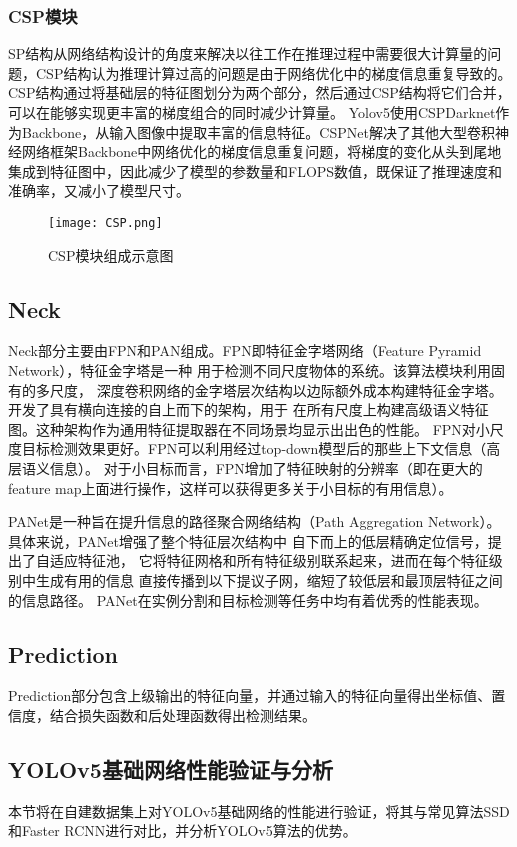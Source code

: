 \subsubsection{CSP模块}
SP结构从网络结构设计的角度来解决以往工作在推理过程中需要很大计算量的问题，CSP结构认为推理计算过高的问题是由于网络优化中的梯度信息重复导致的。CSP结构通过将基础层的特征图划分为两个部分，然后通过CSP结构将它们合并，可以在能够实现更丰富的梯度组合的同时减少计算量。
Yolov5使用CSPDarknet作为Backbone，从输入图像中提取丰富的信息特征。CSPNet解决了其他大型卷积神经网络框架Backbone中网络优化的梯度信息重复问题，将梯度的变化从头到尾地集成到特征图中，因此减少了模型的参数量和FLOPS数值，既保证了推理速度和准确率，又减小了模型尺寸。

\begin{figure}[h]
  \centering
  \texttt{[image: CSP.png]}
  \caption{CSP模块组成示意图}
  \label{csp}
\end{figure}

\subsection{Neck}
Neck部分主要由FPN和PAN组成。FPN即特征金字塔网络（Feature Pyramid Network），特征金字塔是一种
用于检测不同尺度物体的系统。该算法模块利用固有的多尺度，
深度卷积网络的金字塔层次结构以边际额外成本构建特征金字塔。开发了具有横向连接的自上而下的架构，用于
在所有尺度上构建高级语义特征图。这种架构作为通用特征提取器在不同场景均显示出出色的性能。
FPN对小尺度目标检测效果更好。FPN可以利用经过top-down模型后的那些上下文信息（高层语义信息）。
对于小目标而言，FPN增加了特征映射的分辨率（即在更大的feature map上面进行操作，这样可以获得更多关于小目标的有用信息）。

PANet是一种旨在提升信息的路径聚合网络结构（Path Aggregation Network）。
具体来说，PANet增强了整个特征层次结构中
自下而上的低层精确定位信号，提出了自适应特征池，
它将特征网格和所有特征级别联系起来，进而在每个特征级别中生成有用的信息
直接传播到以下提议子网，缩短了较低层和最顶层特征之间的信息路径。
PANet在实例分割和目标检测等任务中均有着优秀的性能表现。

\subsection{Prediction}
Prediction部分包含上级输出的特征向量，并通过输入的特征向量得出坐标值、置信度，结合损失函数和后处理函数得出检测结果。

\subsection{YOLOv5基础网络性能验证与分析}
本节将在自建数据集上对YOLOv5基础网络的性能进行验证，将其与常见算法SSD和Faster RCNN进行对比，并分析YOLOv5算法的优势。

